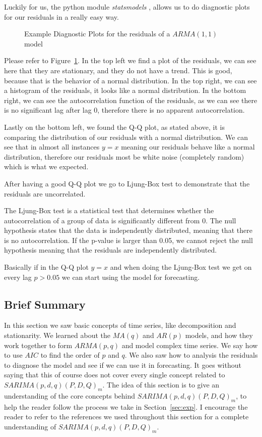 \documentclass[journal]{IEEEtran}
\begin{document}
Luckily for us, the python module \emph{statsmodels} \cite{statsmodels},
allows us to do diagnostic plots for our residuals in a really easy way.

\begin{figure}[htbp]
  \centering
  
    \caption{Example Diagnostic Plots for the residuals of a $ARMA(1,1)$ model}
  \label{fig:diag-example}
\end{figure}

Please refer to Figure~\ref{fig:diag-example}. In the top left we find a plot
of the residuals, we can see here that they are stationary, and they do not
have a trend. This is good, because that is the behavior of a normal
distribution. In the top right, we can see a histogram of the residuals, it
looks like a normal distribution. In the bottom right, we can see the
autocorrelation function of the residuals, as we can see there is no
significant lag after lag 0, therefore there is no apparent autocorrelation.

Lastly on the bottom left, we found the Q-Q plot, as stated above, it is
comparing the distribution of our residuals with a normal distribution. We
can see that in almost all instances $y=x$ meaning our residuals behave like a
normal distribution, therefore our residuals most be white noise (completely
random) which is what we expected.

After having a good Q-Q plot we go to Ljung-Box test to demonstrate that the
residuals are uncorrelated.

The Ljung-Box test is a statistical test that determines whether the
autocorrelation of a group of data is significantly different from 0.
The null hypothesis states that the data is independently distributed,
meaning that there is no autocorrelation. If the p-value is larger than
0.05, we cannot reject the null hypothesis meaning that the residuals are
independently distributed. \cite{timeseries}

Basically if in the Q-Q plot $y = x$ and when doing the Ljung-Box  test we get
on every lag $p > 0.05$ we can start using the model for forecasting.

\subsection{Brief Summary}

In this section we saw basic concepts of time series,  like decomposition and
stationarity. We learned about the $MA(q)$ and $AR(p)$ models, and how they
work together to form $ARMA(p,q)$ and model complex time series. We say how to
use $AIC$ to find the order of $p$ and $q$. We also saw how to analysis the
residuals to diagnose the model and see if we can use it in forecasting. It
goes without saying that this of course does not cover every single concept
related to $SARIMA(p,d,q)(P,D,Q)_m$. The idea of this section is to give an
understanding of the core concepts behind $SARIMA(p,d,q)(P,D,Q)_m$, to help
the reader follow the process we take in Section~\ref{sec:exp}. I encourage
the reader to refer to the references we used throughout this section for a
complete understanding of $SARIMA(p,d,q)(P,D,Q)_m$.
\end{document}

